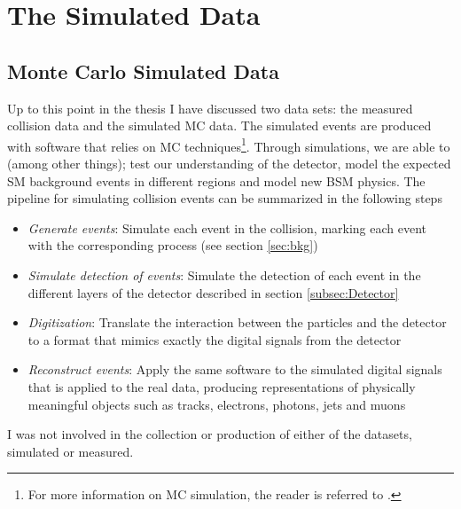 \section{The Simulated Data}
\subsection{Monte Carlo Simulated Data}
Up to this point in the thesis I have discussed two data sets: the measured collision data and the simulated \ac{MC} data. 
The simulated events are produced with software that relies on \acf{MC} techniques\footnote{For 
more information on \ac{MC} simulation, the reader is referred to \cite{raychaudhuri_introduction_2008}.}.
Through simulations, we are able to (among other things); test our understanding of the detector, model the expected \ac{SM} background 
events in different regions and model new \ac{BSM} physics. The pipeline for simulating collision events can be summarized in the following steps
\begin{itemize}
  \item \emph{Generate events}: Simulate each event in the collision, marking each event with the corresponding process (see section \ref{sec:bkg})
  \item \emph{Simulate detection of events}: Simulate the detection of each event in the different layers of the detector described in section \ref{subsec:Detector}
  \item \emph{Digitization}: Translate the interaction between the particles and the detector to a format that mimics exactly the digital signals from the detector
  \item \emph{Reconstruct events}: Apply the same software to the simulated digital signals that is applied to the real data, producing representations of physically 
              meaningful objects such as tracks, electrons, photons, jets and muons
\end{itemize}
I was not involved in the collection or production of either of the datasets, simulated or measured.
